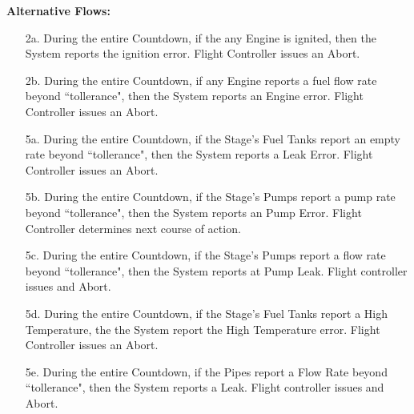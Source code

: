 \documentclass[letterpaper]{article}
\begin{document}
\textbf{Alternative Flows:}
\begin{itemize}
\item[2a.]During the entire Countdown, if the any Engine is ignited,
then the System reports the ignition error.  Flight Controller
issues an Abort.
\item[2b.]During the entire Countdown, if any Engine reports a fuel
flow rate beyond ``tollerance", then the System reports an Engine
error.  Flight Controller issues an Abort.
\item[5a.]During the entire Countdown, if the Stage's Fuel Tanks
report an empty rate beyond ``tollerance", then the System reports a
Leak Error.  Flight Controller issues an Abort.
\item[5b.]During the entire Countdown, if the Stage's Pumps report a
pump rate beyond ``tollerance", then the System reports an Pump Error.
Flight Controller determines next course of action.
\item[5c.]During the entire Countdown, if the Stage's Pumps report a
flow rate beyond ``tollerance", then the System reports at Pump Leak.
Flight controller issues and Abort.
\item[5d.]During the entire Countdown, if the Stage's Fuel Tanks
 report a High Temperature, the the System report the High Temperature
 error.  Flight Controller issues an Abort.
\item[5e.]During the entire Countdown, if the Pipes report a Flow Rate
 beyond ``tollerance", then the System reports a Leak.  Flight
 controller issues and Abort.
\end{itemize}
\end{document}
